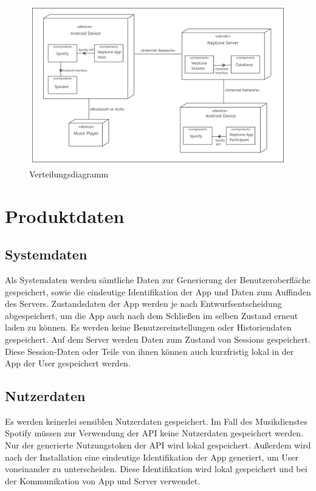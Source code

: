 \documentclass[oneside, ngerman]{sdqtechreport}
\begin{document}
\begin{figure}[h]
    \includegraphics[width = 16cm]{LATEX/Pflichtenheft/GraphicDesigns/Verteilungsdiagramm.png}
    \caption{Verteilungsdiagramm}
    \label{fig:Verteilungsdiagramm}
\end{figure}



\chapter{Produktdaten}
\label{chap:Produktdaten}

\section{Systemdaten}
\label{sec:Produktdaten:Systemdaten}

Als Systemdaten werden sämtliche Daten zur Generierung der Benutzeroberfläche gespeichert, sowie die eindeutige Identifikation der App und Daten zum Auffinden des Servers. Zustandsdaten der App werden je nach Entwurfsentscheidung abgespeichert, um die App auch nach dem Schließen im selben Zustand erneut laden zu können. Es werden keine Benutzereinstellungen oder Historiendaten gespeichert. Auf dem Server werden Daten zum Zustand von Sessions gespeichert. Diese Session-Daten oder Teile von ihnen können auch kurzfristig lokal in der App der User gespeichert werden.

\section{Nutzerdaten}
\label{sec:Produktdaten:Nutzerdaten}

Es werden keinerlei sensiblen Nutzerdaten gespeichert. Im Fall des Musikdienstes Spotify müssen zur Verwendung der API keine Nutzerdaten gespeichert werden. Nur der generierte Nutzungstoken der API wird lokal gespeichert. Außerdem wird nach der Installation eine eindeutige Identifikation der App generiert, um User voneinander zu unterscheiden. Diese Identifikation wird lokal gespeichert und bei der Kommunikation von App und Server verwendet.
\end{document}
